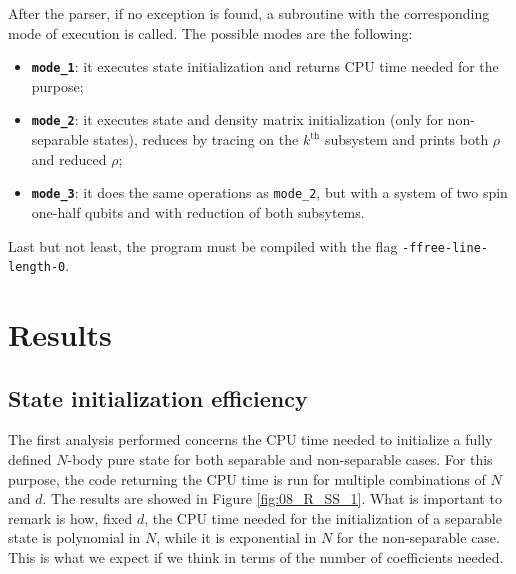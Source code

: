 \documentclass[pra, onecolumn, notitlepage, floats, 11pt]{revtex4-1}
\newcommand{\codebold}[2][cobalt]{\texttt{\bfseries {\color{#1}#2}}}
\newcommand{\code}[2][black]{\color{#1}\texttt{#2}}
\begin{document}
After the parser, if no exception is found, a subroutine with the corresponding mode of execution is called. The possible modes are the following:
\begin{itemize}
    \setlength\itemsep{-3pt}
    \item \codebold[black]{mode\_1}: it executes state initialization and returns CPU time needed for the purpose;
    \item \codebold[black]{mode\_2}: it executes state and density matrix initialization (only for non-separable states), reduces by tracing on the \( k^{\text{th}} \) subsystem and prints both \( \rho \) and reduced \( \rho \);
    \item \codebold[black]{mode\_3}: it does the same operations as \code{mode\_2}, but with a system of two spin one-half qubits and with reduction of both subsytems.
\end{itemize}

Last but not least, the program must be compiled with the flag \code{-ffree-line-length-0}.





\section{Results}



\subsection{State initialization efficiency}
The first analysis performed concerns the CPU time needed to initialize a fully defined \( N \)-body pure state for both separable and non-separable cases. For this purpose, the code returning the CPU time is run for multiple combinations of \( N \) and \( d \). The results are showed in Figure \ref{fig:08_R_SS_1}. What is important to remark is how, fixed \( d \), the CPU time needed for the initialization of a separable state is polynomial in \( N \), while it is exponential in \( N \) for the non-separable case. This is what we expect if we think in terms of the number of coefficients needed.
\end{document}

